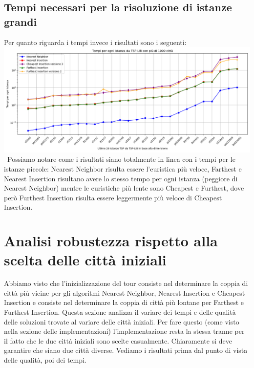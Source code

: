 \documentclass[a4paper,12pt]{report}
\begin{document}
\subsection{Tempi necessari per la risoluzione di istanze grandi}
Per quanto riguarda i tempi invece i risultati sono i seguenti: \newline
\includegraphics[width=1\textwidth]{../Grafici/19.png} \
Possiamo notare come i risultati siano totalmente in linea con i tempi per le istanze piccole: Nearest Neighbor risulta essere l'euristica più veloce, Farthest e Nearest Insertion risultano avere lo stesso tempo per ogni istanza (peggiore di Nearest Neighbor) mentre le euristiche più lente sono Cheapest e Furthest, dove però Furthest Insertion risulta essere leggermente più veloce di Cheapest Insertion.

\section{Analisi robustezza rispetto alla scelta delle città iniziali}
Abbiamo visto che l'inizializzazione del tour consiste nel determinare la coppia di città più vicine per gli algoritmi Nearest Neighbor, Nearest Insertion e Cheapest Insertion e consiste nel determinare la coppia di città più lontane per Farthest e Furthest Insertion. Questa sezione analizza il variare dei tempi e delle qualità delle soluzioni trovate al variare delle città iniziali. Per fare questo (come visto nella sezione delle implementazioni) l'implementazione resta la stessa tranne per il fatto che le due città iniziali sono scelte casualmente. Chiaramente si deve garantire che siano due città diverse. Vediamo i risultati prima dal punto di vista delle qualità, poi dei tempi.
\end{document}
